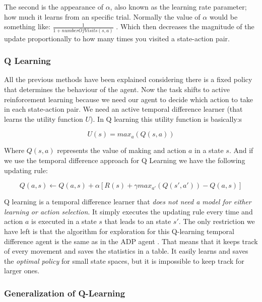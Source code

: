 The second is the appearance of $\alpha$, also known as the learning rate parameter; how much it learns from an specific trial. Normally the value of  $\alpha$ would be something like: $\frac{1}{1+numberOfVisits(s,a)}$ \cite[p382]{ml_tom_mitchel}. Which then decreases the magnitude of the update proportionally to how many times you visited a state-action pair.\\
 

\subsubsection{Q Learning}

All the previous methods have been explained considering there is a fixed policy that determines the behaviour of the agent. Now the task shifts to active reinforcement learning because we need our agent to decide which action to take in each state-action pair. We need an active temporal difference learner (that learns the utility function $U$). In Q learning this utility function is basically:s\cite{rl}

\begin{equation}
U(s) = max_a(Q(s,a))
\end{equation}

Where $Q(s,a)$ represents the value of making and action $a$ in a state $s$. And if we use the temporal difference approach for Q Learning we have the following updating rule:\cite{rl} 

\begin{equation}
Q(a,s) \leftarrow  Q(a,s)  + \alpha [R(s) + \gamma max_{a'}(Q(s',a')) - Q(a,s)]
\end{equation}

Q learning is a temporal difference learner that \textit{does not need a model for either learning or action selection}\cite[p775]{rl}. It simply executes the updating rule every time and action $a$ is executed in a state $s$ that leads to an state $s'$. The only restriction we have left is that the algorithm for exploration for this Q-learning temporal difference agent is the same as in the ADP agent \cite[p776]{rl} . That means that it keeps track of every movement and saves the statistics in a table. It easily learns and saves the \emph{optimal policy} for small state spaces, but it is impossible to keep track for larger ones. 

\subsubsection{Generalization of Q-Learning}	\label{generalization}


